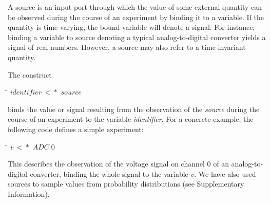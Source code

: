\documentclass[11pt]{article}
\newlength{\lwidth}\setlength{\lwidth}{4.5cm}
\newlength{\cwidth}\setlength{\cwidth}{8mm} %
\newcommand{\Conid}[1]{\mathit{#1}}
\newcommand{\Varid}[1]{\mathit{#1}}
\begin{document}
A source is an input port through which the value of some external
quantity can be observed during the course of an experiment by binding
it to a variable. If the quantity is time-varying, the bound variable
will denote a signal. For instance, binding a variable to source
denoting a typical analog-to-digital converter yields a signal of real
numbers. However, a source may also refer to a time-invariant quantity.

The construct
\begin{tabbing}
\qquad\=\hspace{\lwidth}\=\hspace{\cwidth}\=\+\kill
${\Varid{identifier}\,<\!\!\!*\,\,\Varid{source}}$
\end{tabbing}binds the value or signal resulting from the observation of the
\emph{source} during the course of an experiment to the variable
\emph{identifier}. For a concrete example, the following code defines
a simple experiment:
\begin{tabbing}
\qquad\=\hspace{\lwidth}\=\hspace{\cwidth}\=\+\kill
${\Varid{v}\,<\!\!\!*\,\,\Conid{ADC}\;\mathrm{0}}$
\end{tabbing}This describes the observation of the voltage signal on channel 0 of
an analog-to-digital converter, binding the whole signal to the
variable \ensuremath{\Varid{v}}. We have also used sources to sample values from
probability distributions (see Supplementary Information).
\end{document}
